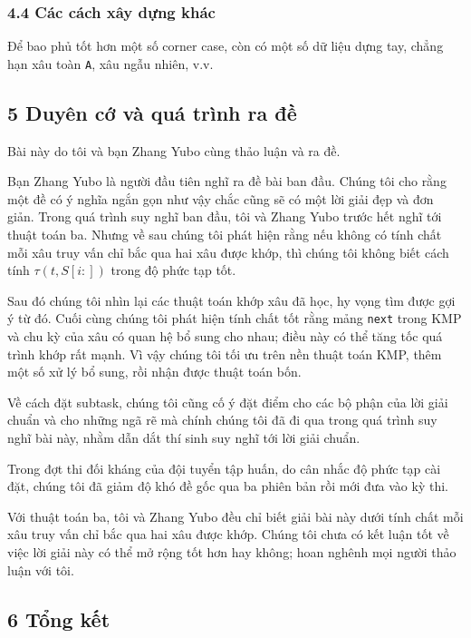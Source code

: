 \documentclass[11pt]{article}
\begin{document}
\subsubsection*{4.4 Các cách xây dựng khác}

Để bao phủ tốt hơn một số corner case, còn có một số dữ liệu dựng tay, chẳng
hạn xâu toàn \texttt{A}, xâu ngẫu nhiên, v.v.

\subsection*{5 Duyên cớ và quá trình ra đề}

Bài này do tôi và bạn Zhang Yubo cùng thảo luận và ra đề.

Bạn Zhang Yubo là người đầu tiên nghĩ ra đề bài ban đầu. Chúng tôi cho rằng
một đề có ý nghĩa ngắn gọn như vậy chắc cũng sẽ có một lời giải đẹp và đơn
giản. Trong quá trình suy nghĩ ban đầu, tôi và Zhang Yubo trước hết nghĩ tới
thuật toán ba. Nhưng về sau chúng tôi phát hiện rằng nếu không có tính chất mỗi
xâu truy vấn chỉ bắc qua hai xâu được khớp, thì chúng tôi không biết cách tính
\(\tau(t,S[i:])\) trong độ phức tạp tốt.

Sau đó chúng tôi nhìn lại các thuật toán khớp xâu đã học, hy vọng tìm được gợi
ý từ đó. Cuối cùng chúng tôi phát hiện tính chất tốt rằng mảng \texttt{next}
trong KMP và chu kỳ của xâu có quan hệ bổ sung cho nhau; điều này có thể tăng
tốc quá trình khớp rất mạnh. Vì vậy chúng tôi tối ưu trên nền thuật toán KMP,
thêm một số xử lý bổ sung, rồi nhận được thuật toán bốn.

Về cách đặt subtask, chúng tôi cũng cố ý đặt điểm cho các bộ phận của lời giải
chuẩn và cho những ngã rẽ mà chính chúng tôi đã đi qua trong quá trình suy nghĩ
bài này, nhằm dẫn dắt thí sinh suy nghĩ tới lời giải chuẩn.

Trong đợt thi đối kháng của đội tuyển tập huấn, do cân nhắc độ phức tạp cài
đặt, chúng tôi đã giảm độ khó đề gốc qua ba phiên bản rồi mới đưa vào kỳ thi.

Với thuật toán ba, tôi và Zhang Yubo đều chỉ biết giải bài này dưới tính chất
mỗi xâu truy vấn chỉ bắc qua hai xâu được khớp. Chúng tôi chưa có kết luận tốt
về việc lời giải này có thể mở rộng tốt hơn hay không; hoan nghênh mọi người
thảo luận với tôi.

\subsection*{6 Tổng kết}
\end{document}
